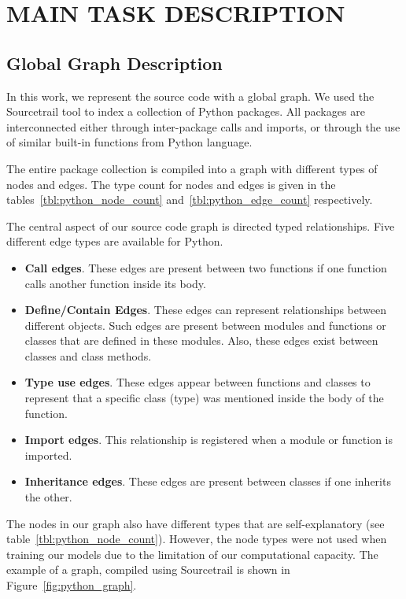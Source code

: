 \documentclass[a4paper,twoside]{article}
\begin{document}
\section{\uppercase{Main Task Description}}

\subsection{Global Graph Description}

In this work, we represent the source code with a global graph. We used the Sourcetrail tool to index a collection of Python packages. All packages are interconnected either through inter-package calls and imports, or through the use of similar built-in functions from Python language. 

The entire package collection is compiled into a graph with different types of nodes and edges. The type count for nodes and edges is given in the tables~\ref{tbl:python_node_count} and~\ref{tbl:python_edge_count} respectively.

The central aspect of our source code graph is directed typed relationships. Five different edge types are available for Python.

\begin{itemize}
    \item \textbf{Call edges}. These edges are present between two functions if one function calls another function inside its body.
    \item \textbf{Define/Contain Edges}. These edges can represent relationships between different objects. Such edges are present between modules and functions or classes that are defined in these modules. Also, these edges exist between classes and class methods.
    \item \textbf{Type use edges}. These edges appear between functions and classes to represent that a specific class (type) was mentioned inside the body of the function.
    \item \textbf{Import edges}. This relationship is registered when a module or function is imported.
    \item \textbf{Inheritance edges}. These edges are present between classes if one inherits the other. 
\end{itemize}

The nodes in our graph also have different types that are self-explanatory (see table~\ref{tbl:python_node_count}). However, the node types were not used when training our models due to the limitation of our computational capacity. The example of a graph, compiled using Sourcetrail is shown in Figure~\ref{fig:python_graph}.
\end{document}
